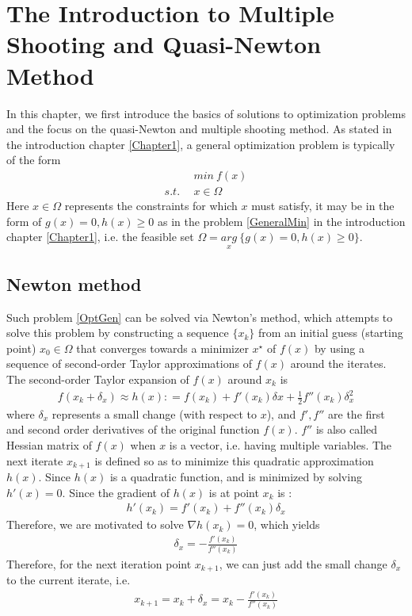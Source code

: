 \chapter{The Introduction to Multiple Shooting and Quasi-Newton Method}
In this chapter, we first introduce the basics of solutions to optimization problems and the focus on the quasi-Newton and multiple shooting method. 
As stated in the introduction chapter \ref{Chapter1}, a general optimization problem is typically of the form 
\begin{equation}
	\begin{aligned}
		\  \  \ & min \  f(x) \\
		s.t.\ \  & x \in \Omega
	\end{aligned}
	\label{OptGen}
\end{equation}
Here $x \in \Omega$ represents the constraints for which $x$ must satisfy, it may be in the form of $ g(x) = 0,  h(x)  \geq  0$ as in the problem \ref{GeneralMin} in the introduction chapter \ref{Chapter1}, i.e. the feasible set $\Omega = \underset{x}{arg} \ \{ g(x) = 0,  h(x)  \geq  0 \}$. 

\section{Newton method}
Such problem \ref{OptGen} can be solved via Newton's method, which attempts to solve this problem by constructing a sequence $\{x_k\}$ from an initial guess (starting point) $x_0 \in \Omega$ that converges towards a minimizer $x^\star$ of $f(x)$  by using a sequence of second-order Taylor approximations of $f(x)$ around the iterates. The second-order Taylor expansion of $f(x)$ around $x_k$ is
\begin{align*}
f(x_k + \delta_x) \approx h(x) : = f(x_k) + f'(x_k)\delta x +\frac{1}{2}f''(x_k)\delta_x^2 
\end{align*}
where $\delta_x$ represents a small change (with respect to $x$), and $f', f''$ are the first and second order derivatives of the original function $f(x)$. $f''$ is also called Hessian matrix of $f(x)$ when $x$ is a vector, i.e. having multiple variables. The next iterate $x_{k+1}$ is defined so as to minimize this quadratic approximation $h(x)$. Since $h(x)$ is a quadratic function, and is minimized by solving $h'(x) = 0$. Since the gradient of $h(x)$ is at point $x_k$ is :
\begin{align*}
h'(x_k) = f'(x_k) +f''(x_k)\delta_x 
\end{align*}
Therefore, we are motivated to solve $\nabla  h(x_k) =0$, which yields
\begin{align*}
	\delta_x  = - \frac{ f'(x_k)}{f''(x_k)}
\end{align*}
Therefore, for the next iteration point $x_{k+1}$, we can just add the small change $\delta_x$ to the current iterate, i.e. 
\begin{align*}
	x_{k+1}  = x_k + \delta_x = x_k - \frac{ f'(x_k)}{f''(x_k)}
\end{align*}

